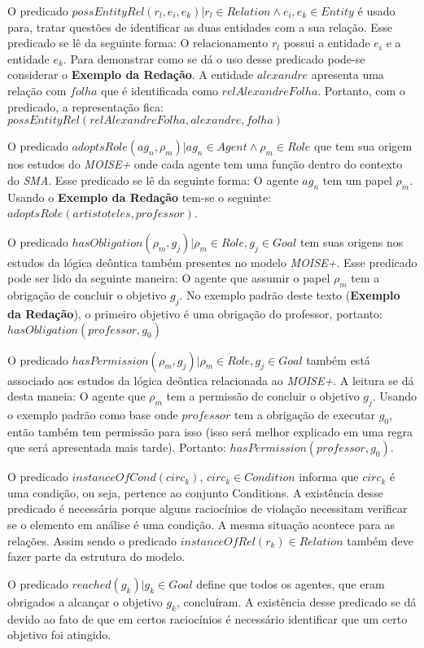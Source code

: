 O predicado $possEntityRel(r_l,e_i,e_k) | r_l \in Relation \wedge  e_i, e_k \in Entity$ é usado para, tratar questões de identificar as duas entidades com a sua relação. Esse predicado se lê da seguinte forma: O relacionamento $r_l$ possui a entidade $e_i$ e a entidade $e_k$. Para demonstrar como se dá o uso desse predicado pode-se considerar o \textbf{Exemplo da Redação}. A entidade $alexandre$ apresenta uma relação com $folha$ que é identificada como $relAlexandreFolha$. Portanto, com o predicado, a representação fica: $possEntityRel(relAlexandreFolha,alexandre,folha)$

O predicado $adoptsRole(ag_n,\rho_m) | ag_n \in Agent \wedge \rho_m \in Role$ que tem sua origem nos estudos do \textit{MOISE+} onde cada agente tem uma função dentro do contexto do \textit{SMA}. Esse predicado se lê da seguinte forma: O agente $ag_n$ tem um papel $\rho_m$. Usando o \textbf{Exemplo da Redação} tem-se o seguinte: $adoptsRole(artistoteles,professor)$. 

O predicado $hasObligation(\rho_m,g_j) | \rho_m \in Role, g_j \in Goal $ tem suas origens nos estudos da lógica deôntica também presentes no modelo \textit{MOISE+}. Esse predicado pode ser lido da seguinte maneira: O agente que assumir o papel $\rho_m$ tem a obrigação de concluir o objetivo $g_j$. No exemplo padrão deste texto (\textbf{Exemplo da Redação}), o primeiro objetivo é uma obrigação do professor, portanto: $hasObligation(professor,g_0)$

O predicado $hasPermission(\rho_m, g_j) | \rho_m \in Role, g_j \in Goal $ também está associado aos estudos da lógica deôntica relacionada ao \textit{MOISE+}. A leitura se dá desta maneia: O agente que $\rho_m$ tem a permissão de concluir o objetivo $g_j$. Usando o exemplo padrão como base onde $professor$ tem a obrigação de executar $g_0$, então também tem permissão para isso (isso será melhor explicado em uma regra que será apresentada mais tarde). Portanto: $hasPermission(professor,g_0)$.  

O predicado $instanceOfCond(circ_k)$, $circ_k \in Condition$ informa que $circ_k$ é uma condição, ou seja, pertence ao conjunto Conditions. A existência desse predicado é necessária porque alguns raciocínios de violação necessitam verificar se o elemento em análise é uma condição. A mesma situação acontece para as relações. Assim sendo o predicado $ instanceOfRel(r_k) \in Relation $ também deve fazer parte da estrutura do modelo.

O predicado $reached(g_k) | g_k \in Goal $ define que todos os agentes, que eram obrigados a alcançar o objetivo $g_k$, concluíram. A existência desse predicado se dá devido ao fato de que em certos raciocínios é necessário identificar que um certo objetivo foi atingido. 

